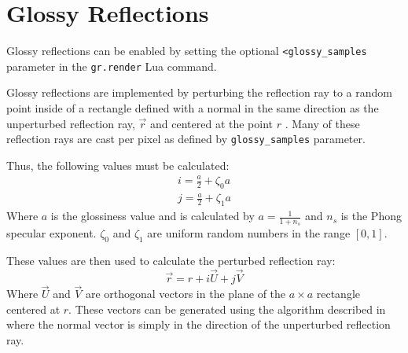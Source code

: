 \section{Glossy Reflections}

Glossy reflections can be enabled by setting the optional 
\newline \verb|<glossy_samples| parameter in the 
\verb|gr.render| Lua command.

Glossy reflections are implemented by perturbing the reflection ray to a random
point inside of a rectangle defined with a normal in the same direction as the
unperturbed reflection ray, $\vec{r}$ and centered at the point $r$ 
\cite{12_shirley_marschner_2009}. Many of these reflection rays are cast per 
pixel as defined by \verb|glossy_samples| parameter.

Thus, the following values must be calculated:
\begin{equation}
\begin{split}
  i = \frac{a}{2} + \zeta_{0}a \\
  j = \frac{a}{2} + \zeta_{1}a
\end{split}
\end{equation}
Where $a$ is the glossiness value and is calculated by $a = \frac{1}{1 + n_{s}}$
and $n_{s}$ is the Phong specular exponent. $\zeta_{0}$ and $\zeta_{1}$ are
uniform random numbers in the range $[0, 1]$.

These values are then used to calculate the perturbed reflection ray:
\begin{equation}
  \vec{r} = r + i\vec{U} + j\vec{V}
\end{equation}
Where $\vec{U}$ and $\vec{V}$ are orthogonal vectors in the plane of the
$a\times a$ rectangle centered at $r$. These vectors can be generated using the
algorithm described in \cite{6_hughes_moller_2005} where the normal vector is
simply in the direction of the unperturbed reflection ray.

